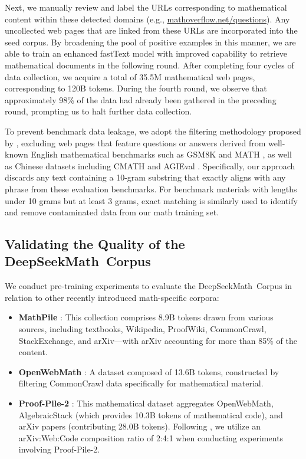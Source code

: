 \begin{itemize}[topsep=0pt]
Next, we manually review and label the URLs corresponding to mathematical content within these detected domains (e.g., \url{mathoverflow.net/questions}). Any uncollected web pages that are linked from these URLs are incorporated into the seed corpus. By broadening the pool of positive examples in this manner, we are able to train an enhanced fastText model with improved capability to retrieve mathematical documents in the following round. After completing four cycles of data collection, we acquire a total of 35.5M mathematical web pages, corresponding to 120B tokens. During the fourth round, we observe that approximately 98\% of the data had already been gathered in the preceding round, prompting us to halt further data collection.

To prevent benchmark data leakage, we adopt the filtering methodology proposed by \cite{deepseek-coder}, excluding web pages that feature questions or answers derived from well-known English mathematical benchmarks such as GSM8K \citep{gsm8k} and MATH \citep{MATH}, as well as Chinese datasets including CMATH \citep{wei2023cmath} and AGIEval \citep{agieval}. Specifically, our approach discards any text containing a 10-gram substring that exactly aligns with any phrase from these evaluation benchmarks. For benchmark materials with lengths under 10 grams but at least 3 grams, exact matching is similarly used to identify and remove contaminated data from our math training set.

\subsection{Validating the Quality of the DeepSeekMath~Corpus}

We conduct pre-training experiments to evaluate the DeepSeekMath~Corpus in relation to other recently introduced math-specific corpora:

\begin{itemize}[topsep=0pt]
    \item \textbf{MathPile} \citep{mathpile}: This collection comprises 8.9B tokens drawn from various sources, including textbooks, Wikipedia, ProofWiki, CommonCrawl, StackExchange, and arXiv—with arXiv accounting for more than 85\% of the content.
    \item \textbf{OpenWebMath} \citep{openwebmath}: A dataset composed of 13.6B tokens, constructed by filtering CommonCrawl data specifically for mathematical material.
    \item \textbf{Proof-Pile-2} \citep{llemma}: This mathematical dataset aggregates OpenWebMath, AlgebraicStack (which provides 10.3B tokens of mathematical code), and arXiv papers (contributing 28.0B tokens). Following \cite{llemma}, we utilize an arXiv:Web:Code composition ratio of 2:4:1 when conducting experiments involving Proof-Pile-2.
\end{itemize}


\end{itemize}
